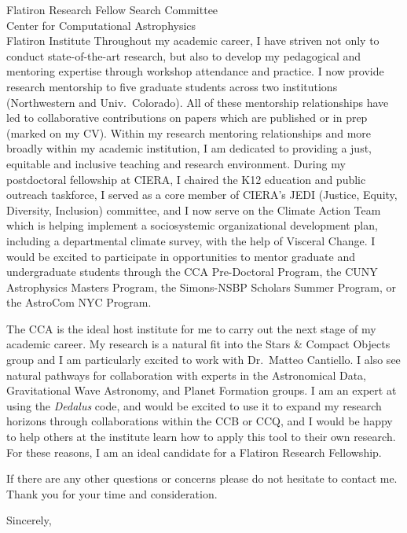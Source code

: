 \documentclass[12pt]{letter}
\begin{document}
\begin{letter}{
               Flatiron Research Fellow Search Committee \\
               Center for Computational Astrophysics \\
               Flatiron Institute 
           }
    Throughout my academic career, I have striven not only to conduct state-of-the-art research, but also to develop my pedagogical and mentoring expertise through workshop attendance and practice.
    I now provide research mentorship to five graduate students across two institutions (Northwestern and Univ.~Colorado).
    All of these mentorship relationships have led to collaborative contributions on papers which are published or in prep (marked on my CV).
    Within my research mentoring relationships and more broadly within my academic institution, I am dedicated to providing a just, equitable and inclusive teaching and research environment.
    During my postdoctoral fellowship at CIERA, I chaired the K12 education and public outreach taskforce, I served as a core member of CIERA's JEDI (Justice, Equity, Diversity, Inclusion) committee, and I now serve on the Climate Action Team which is helping implement a sociosystemic organizational development plan, including a departmental climate survey, with the help of Visceral Change.
    I would be excited to participate in opportunities to mentor graduate and undergraduate students through the CCA Pre-Doctoral Program, the CUNY Astrophysics Masters Program, the Simons-NSBP Scholars Summer Program, or the AstroCom NYC Program. 

    The CCA is the ideal host institute for me to carry out the next stage of my academic career.
    My research is a natural fit into the Stars \& Compact Objects group and I am particularly excited to work with Dr.~Matteo Cantiello.
    I also see natural pathways for collaboration with experts in the Astronomical Data, Gravitational Wave Astronomy, and Planet Formation groups.
    I am an expert at using the \emph{Dedalus} code, and would be excited to use it to expand my research horizons through collaborations within the CCB or CCQ, and I would be happy to help others at the institute learn how to apply this tool to their own research.
    For these reasons, I am an ideal candidate for a Flatiron Research Fellowship.

    If there are any other questions or concerns please do not hesitate to contact me.
    Thank you for your time and consideration.

\closing{Sincerely,}
\vspace{-0.9in}
\\
\end{letter}
\end{document}
